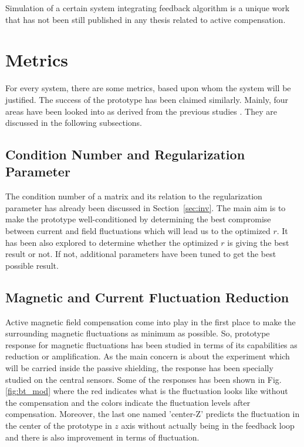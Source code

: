 Simulation of a certain system integrating feedback algorithm is a unique work that has not been still published in any thesis related to active compensation.

\section{Metrics\label{sec:metrics}}
For every system, there are some metrics, based upon whom the system will be justified. The success of the prototype has been claimed similarly. Mainly, four areas have been looked into as derived from the previous studies \cite{bea,lins,rawlik}. They are discussed in the following subsections.

\subsection{Condition Number and Regularization Parameter}
The condition number of a matrix and its relation to the regularization parameter has already been discussed in Section~\ref{sec:inv}. The main aim is to make the prototype well-conditioned by determining the best compromise between current and field fluctuations which will lead us to the optimized $r$. It has been also explored to determine whether the optimized $r$ is giving the best result or not. If not, additional parameters have been tuned to get the best possible result.

\subsection{Magnetic and Current Fluctuation Reduction}

Active magnetic field compensation come into play in the first place to make the surrounding magnetic fluctuations as minimum as possible. So, prototype response for magnetic fluctuations has been studied in terms of its capabilities as reduction or amplification. As the main concern is about the experiment which will be carried inside the passive shielding, the response has been specially studied on the central sensors. Some of the responses has been shown in Fig. \ref{fig:bt_mod} where the red indicates what is the fluctuation looks like without the compensation and the colors indicate the fluctuation levels after compensation. Moreover, the last one named 'center-Z' predicts the fluctuation in the center of the prototype in $z$ axis without actually being in the feedback loop and there is also improvement in terms of fluctuation.

